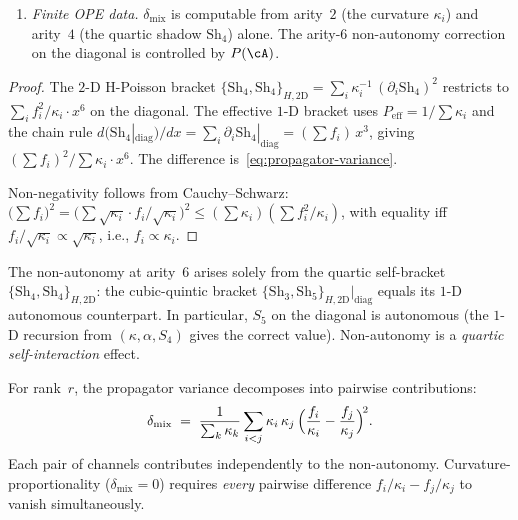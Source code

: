 \begin{proposition}
\begin{enumerate}[label=\textup{(\roman*)}]
\item \emph{Finite OPE data.}
  $\delta_{\mathrm{mix}}$ is computable from arity~$2$
  \textup{(}the curvature $\kappa_i$\textup{)} and arity~$4$
  \textup{(}the quartic shadow $\mathrm{Sh}_4$\textup{)} alone.
  The arity-$6$ non-autonomy correction on the diagonal
  is controlled by $P(\cA)$.
\end{enumerate}
\end{proposition}

\begin{proof}
The $2$-D H-Poisson bracket
$\{\mathrm{Sh}_4, \mathrm{Sh}_4\}_{H,2\text{D}}
= \sum_i \kappa_i^{-1}\,(\partial_i \mathrm{Sh}_4)^2$
restricts to $\sum_i f_i^2/\kappa_i \cdot x^6$ on the diagonal.
The effective $1$-D bracket uses $P_{\mathrm{eff}} = 1/\sum\kappa_i$
and the chain rule $d(\mathrm{Sh}_4|_{\mathrm{diag}})/dx
= \sum_i \partial_i \mathrm{Sh}_4|_{\mathrm{diag}} = (\sum f_i)\,x^3$,
giving $(\sum f_i)^2/\sum\kappa_i \cdot x^6$.
The difference is~\eqref{eq:propagator-variance}.

Non-negativity follows from Cauchy--Schwarz:
$\bigl(\sum f_i\bigr)^2
= \bigl(\sum \sqrt{\kappa_i} \cdot f_i/\sqrt{\kappa_i}\bigr)^2
\leq (\sum \kappa_i)(\sum f_i^2/\kappa_i)$,
with equality iff $f_i/\sqrt{\kappa_i} \propto \sqrt{\kappa_i}$,
i.e., $f_i \propto \kappa_i$.
\end{proof}

\begin{remark}[$S_5$ autonomy]
\label{rem:s5-autonomy}
The non-autonomy at arity~$6$ arises solely from the quartic self-bracket $\{\mathrm{Sh}_4, \mathrm{Sh}_4\}_{H,2\text{D}}$: the cubic-quintic bracket $\{\mathrm{Sh}_3, \mathrm{Sh}_5\}_{H,2\text{D}}|_{\mathrm{diag}}$ equals its $1$-D autonomous counterpart.  In particular, $S_5$ on the diagonal is autonomous (the $1$-D recursion from $(\kappa, \alpha, S_4)$ gives the correct value).  Non-autonomy is a \emph{quartic self-interaction} effect.
\end{remark}

\begin{remark}
\label{rem:sum-of-squares}
For rank~$r$, the propagator variance decomposes into pairwise contributions:
\[
  \delta_{\mathrm{mix}}
  \;=\;
  \frac{1}{\sum_k \kappa_k}
  \sum_{i < j} \kappa_i\,\kappa_j\,
  \Bigl(\frac{f_i}{\kappa_i} - \frac{f_j}{\kappa_j}\Bigr)^{\!2}.
\]
Each pair of channels contributes independently to the non-autonomy.  Curvature-proportionality ($\delta_{\mathrm{mix}} = 0$) requires \emph{every} pairwise difference $f_i/\kappa_i - f_j/\kappa_j$ to vanish simultaneously.
\end{remark}

